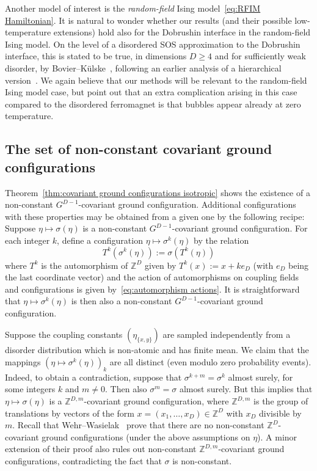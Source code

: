 \documentclass[11pt, reqno]{amsart}
\newcommand{\Z}{\mathbb{Z}}
\numberwithin{equation}{section}
\begin{document}
Another model of interest is the \emph{random-field} Ising model~\eqref{eq:RFIM Hamiltonian}. It is natural to wonder whether our results (and their possible low-temperature extensions) hold also for the Dobrushin interface in the random-field Ising model. On the level of a disordered SOS approximation to the Dobrushin interface, this is stated to be true, in dimensions $D\ge 4$ and for sufficiently weak disorder, by Bovier--K\"ulske~\cite{BK}, following an earlier analysis of a hierarchical version~\cite{BK92}. We again believe that our methods will be relevant to the random-field Ising model case, but point out that an extra complication arising in this case compared to the disordered ferromagnet is that bubbles appear already at zero temperature.

\subsection{The set of non-constant covariant ground configurations}\label{sec:set of non-constant covariatn ground configurations} Theorem~\ref{thm:covariant ground configurations isotropic} shows the existence of a non-constant $G^{D-1}$-covariant ground configuration.  Additional configurations with these properties may be obtained from a given one by the following recipe: Suppose $\eta\mapsto\sigma(\eta)$ is a non-constant $G^{D-1}$-covariant ground configuration. For each integer $k$, define a configuration $\eta\mapsto\sigma^k(\eta)$ by the relation
\begin{equation}
T^k(\sigma^k(\eta)):=\sigma(T^k(\eta))
\end{equation}
where $T^k$ is the automorphism of $\Z^D$ given by $T^k(x):=x+ke_D$ (with $e_D$ being the last coordinate vector) and the action of automorphisms on coupling fields and configurations is given by~\eqref{eq:automorphism actions}. It is straightforward that $\eta\mapsto\sigma^k(\eta)$ is then also a non-constant $G^{D-1}$-covariant ground configuration. 

Suppose the coupling constants $(\eta_{\{x,y\}})$ are sampled independently from a disorder distribution which is non-atomic and has finite mean. We claim that the mappings $(\eta\mapsto\sigma^k(\eta))_k$ are all distinct (even modulo zero probability events). Indeed, to obtain a contradiction, suppose that $\sigma^{k+m}= \sigma^k$ almost surely, for some integers $k$ and $m\neq 0$. Then also $\sigma^m = \sigma$ almost surely. But this implies that $\eta\mapsto\sigma(\eta)$ is a $\Z^{D,m}$-covariant ground configuration, where $\Z^{D,m}$ is the group of translations by vectors of the form $x = (x_1,\ldots, x_D)\in\Z^D$ with $x_D$ divisible by~$m$. Recall that Wehr--Wasielak~\cite{WW16} prove that there are no non-constant $\Z^D$-covariant ground configurations (under the above assumptions on $\eta$). A minor extension of their proof also rules out non-constant $\Z^{D,m}$-covariant ground configurations, contradicting the fact that $\sigma$ is non-constant. 
\end{document}
